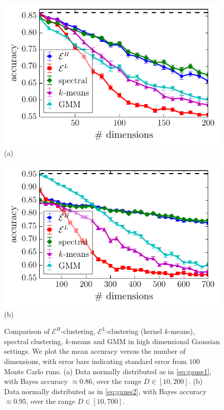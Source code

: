 \documentclass[aps,preprint,nofootinbib,floatfix]{revtex4-1}
\begin{document}
\begin{figure}
\begin{minipage}{0.49\textwidth}
\includegraphics[width=1\textwidth]{normal_highdim_mean.pdf}\\[-1.0em] (a)
\end{minipage}
\begin{minipage}{0.49\textwidth}
\includegraphics[width=1\textwidth]{normal_highdim_cov.pdf}\\[-1.0em] (b)
\end{minipage}
\caption{
\label{fig:gauss}
Comparison of $\mathcal{E}^H$-clustering, $\mathcal{E}^L$-clustering (kernel
$k$-means), spectral clustering, $k$-means and GMM in
high dimensional Gaussian settings. We plot the mean accuracy versus
the number of dimensions, with error bars indicating standard 
error from $100$ Monte
Carlo runs.
(a) Data normally distributed as in \eqref{eq:gauss1}, with Bayes
accuracy $\approx 0.86$, over the range $D \in [10,200]$. 
(b) Data normally distributed
as in \eqref{eq:gauss2}, with Bayes accuracy $\approx 0.95$,
over the range $D \in [10, 700]$.
}
\end{figure} 
\end{document}
